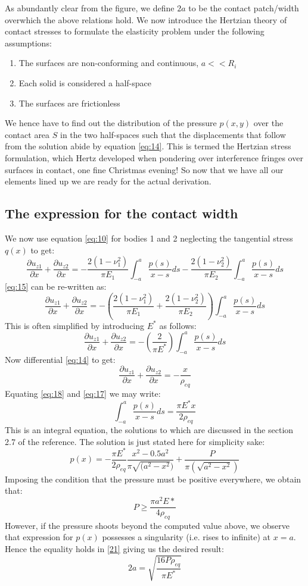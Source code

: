 \documentclass{article}
\begin{document}
As abundantly clear from the figure, we define $2a$ to be the contact patch/width overwhich the above relations hold. We now introduce the Hertzian theory of contact stresses to formulate the elasticity problem under the following assumptions: 
\begin{enumerate}
\item The surfaces are non-conforming and continuous, $a<<R_i$
\item Each solid is considered a half-space
\item The surfaces are frictionless
\end{enumerate}
We hence have to find out the distribution of the pressure $p(x,y)$ over the contact area $S$ in the two half-spaces such that the displacements that follow from the solution abide by equation \eqref{eq:14}. This is termed the Hertzian stress formulation, which Hertz developed when pondering over interference fringes over surfaces in contact, one fine Christmas evening! So now that we have all our elements lined up we are ready for the actual derivation. 
\subsection{The expression for the contact width}
We now use equation \eqref{eq:10} for bodies 1 and 2 neglecting the tangential stress $q(x)$ to get: 
\[
\frac{\partial u_{z1}}{\partial x} + \frac{\partial u_{z2}}{\partial x} = -\frac{2(1-\nu_1^2)}{\pi E_1}{\int_{-a}^{a}\frac{p(s)}{x-s}ds} -\frac{2(1-\nu_2^2)}{\pi E_2}{\int_{-a}^{a}\frac{p(s)}{x-s}ds} \tag{15} \label{eq:15} 
\]
\eqref{eq:15} can be re-written as: 
\[
\frac{\partial u_{z1}}{\partial x} + \frac{\partial u_{z2}}{\partial x} = -(\frac{2(1-\nu_1^2)}{\pi E_1}+\frac{2(1-\nu_2^2)}{\pi E_2}){\int_{-a}^{a}\frac{p(s)}{x-s}ds} \tag{16} \label{eq:16}
\]
This is often simplified by introducing $E^*$ as follows: 
\[
\frac{\partial u_{z1}}{\partial x} + \frac{\partial u_{z2}}{\partial x} = -(\frac{2}{\pi E^*}){\int_{-a}^{a}\frac{p(s)}{x-s}ds} \tag{17} \label{eq:17}
\] 
Now differential \eqref{eq:14} to get: 
\[
\frac{\partial u_{z1}}{\partial x} + \frac{\partial u_{z2}}{\partial x} = -\frac{x}{\rho_{eq}} \tag{18} \label{eq:18}
\] 
Equating \eqref{eq:18} and \eqref{eq:17} we may write: 
\[
{\int_{-a}^{a}\frac{p(s)}{x-s}ds} = \frac{\pi E^*x}{2 \rho_{eq}} \tag{19} \label{eq:19}
\]
This is an integral equation, the solutions to which are discussed in the section 2.7 of the reference. The solution is just stated here for simplicity sake: 
\[
p(x) = -\frac{\pi E^*}{2\rho_{eq}}\frac{x^2-0.5a^2}{\pi \sqrt{(a^2-x^2})} + \frac{P}{\pi (\sqrt{a^2-x^2})} \tag{20} \label{eq:20}
\]
Imposing the condition that the pressure must be positive everywhere, we obtain that:
\[
P\geq\frac{\pi a^2 E*}{4\rho_{eq}} \tag{21} \label{21}
\]
However, if the pressure shoots beyond the computed value above, we observe that expression for $p(x)$ possesses a singularity (i.e. rises to infinite) at $x=a$. Hence the equality holds in \eqref{21} giving us the desired result: 
\[
2a = \sqrt{\frac{16P\rho_{eq}}{\pi E^*}} \tag{22} 
\]
\end{document}
